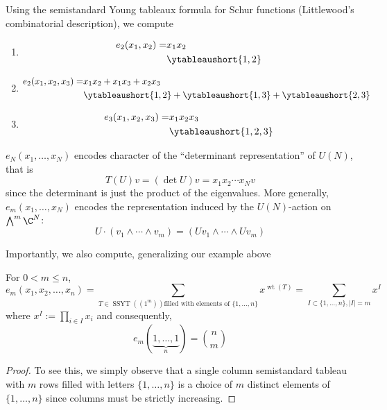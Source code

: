 \documentclass[11pt,leqno,oneside]{amsart}
\numberwithin{thm}{section}
\DeclareMathOperator{\SSYT}{SSYT}
\DeclareMathOperator{\wt}{wt}
\begin{document}
\begin{example}
  Using the semistandard Young tableaux formula for Schur functions
  (Littlewood's combinatorial description), we compute
  \begin{enumerate}
  \item
    \begin{align*}
      e_2(x_1,x_2) =
      & x_1 x_2\\
      & \ytableaushort{1,2}
    \end{align*}
  \item
    \begin{align*}
      e_2(x_1,x_2,x_3) =
      & x_1 x_2 + x_1 x_3 + x_2 x_3 \\
      & \ytableaushort{1,2} + \ytableaushort{1,3} + \ytableaushort{2,3}
    \end{align*}
  \item
    \begin{align*}
      e_3(x_1,x_2,x_3) =
      & x_1 x_2 x_3 \\
      & \ytableaushort{1,2,3}
    \end{align*}
  \end{enumerate}
\end{example}
\begin{rmk}
  \(e_N(x_1, \ldots, x_N)\) encodes character of the ``determinant
  representation'' 
  of \(U(N)\), that is \[
    T(U)v = (\det U)v = x_1 x_2 \cdots x_N v
  \]
  since the determinant is just the product of the
  eigenvalues. More generally, \(e_m(x_1, \ldots, x_N)\) encodes the
  representation induced by the \(U(N)\)-action on \(\bigwedge^m
  \C^N\): \[
    U\cdot(v_1 \wedge \cdots \wedge v_m) = (Uv_1 \wedge \cdots \wedge
    Uv_m)
  \]
\end{rmk}
Importantly, we also compute, generalizing our example above
\begin{prop}
  For \(0 < m \leq n\), 
  \[
    e_m(x_1, x_2, \ldots, x_n) = \sum_{T \in \SSYT((1^m)) \text{
        filled with elements of }\{1,\ldots,n\}} x^{\wt(T)} = \sum_{I
      \subset 
      \{1, \ldots, n\}, |I| = m} x^I
  \]
  where \(x^I := \prod_{i \in I} x_i\) and consequently, \[
    e_m(\underbrace{1, \ldots, 1}_{n}) = \binom{n}{m}
  \]
\end{prop}
\begin{proof}
  To see this, we simply observe that a single column semistandard
  tableau with \(m\) rows filled with letters \(\{1,\ldots,n\}\) is a
  choice of \(m\) distinct elements of \(\{1,\ldots,n\}\) since
  columns must be strictly increasing. 
\end{proof}
\end{document}
